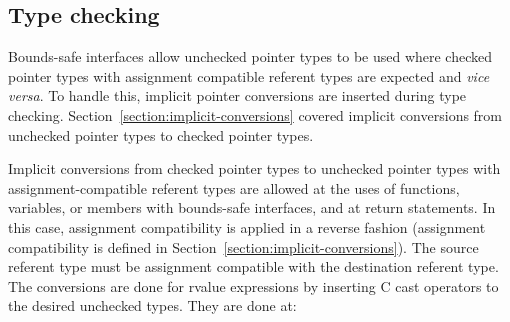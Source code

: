 \subsection{Type checking}
\label{section:bounds-safe-interface-type-checking}

Bounds-safe interfaces allow unchecked pointer types to be used
where checked pointer types with assignment compatible referent types are
expected and {\it vice versa}.
To handle this, implicit pointer conversions are inserted during type checking.
Section~\ref{section:implicit-conversions} covered implicit conversions from unchecked pointer types to checked pointer types.

Implicit conversions from checked pointer types to unchecked pointer types
with assignment-compatible referent types are allowed at the uses of functions,
variables, or members with bounds-safe interfaces, and at return statements.  
In this case, assignment compatibility is applied in a reverse fashion (assignment compatibility
is defined in Section~\ref{section:implicit-conversions}).
The source referent type must be
assignment compatible with the destination referent type.  The conversions are
done for rvalue expressions by inserting C cast operators to the desired unchecked types.
They are done at:
